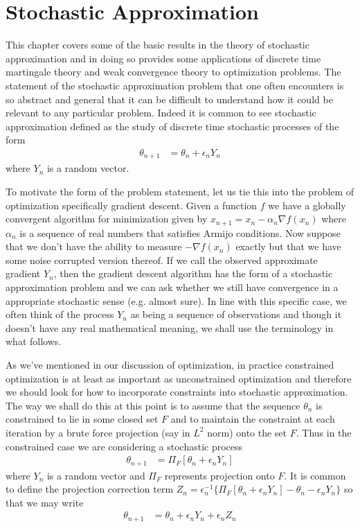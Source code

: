 \chapter{Stochastic Approximation}

This chapter covers some of the basic results in the theory of stochastic approximation and in doing so provides some applications of discrete time martingale theory and weak convergence theory to optimization problems.  The statement of the stochastic approximation problem that one often encounters is so abstract and general that it can be difficult to understand how it could be relevant to any particular problem.  Indeed it is common to see stochastic approximation defined as the study of discrete time stochastic processes of the form 
\begin{align*}
\theta_{n+1} &= \theta_n + \epsilon_n Y_n
\end{align*} 
where $Y_n$ is a random vector.

To motivate the form of the problem statement, let us tie this into the problem of optimization specifically gradient descent.  Given a function $f$ we have a globally convergent algorithm for minimization given by $x_{n+1} = x_n - \alpha_n \nabla f(x_n)$ where $\alpha_n$ is a sequence of real numbers that satisfies Armijo conditions.  Now suppose that we don't have the ability to measure $-\nabla f(x_n)$ exactly but that we have some noise corrupted  version thereof.  If we call the observed approximate gradient $Y_n$, then the gradient descent algorithm has the form of a stochastic approximation problem and we can ask whether we still have convergence in a appropriate stochastic sense (e.g. almost sure).  In line with this specific case, we often think of the process $Y_n$ as being a sequence of observations and though it doesn't have any real mathematical meaning, we shall use the terminology in what follows.

As we've mentioned in our discussion of optimization, in practice constrained optimization is at least as important as unconstrained optimization and therefore we should look for how to incorporate constraints into stochastic approximation.  The way we shall do this at this point is to assume that the sequence $\theta_n$ is constrained to lie in some closed set $F$ and to maintain the constraint at each iteration by a brute force projection (say in $L^2$ norm) onto the set $F$.   Thus in the constrained case we are considering a stochastic process 
\begin{align*}
\theta_{n+1} &= \Pi_F \left[ \theta_n + \epsilon_n Y_n\right ]
\end{align*} 
where $Y_n$ is a random vector and $\Pi_F$ represents projection onto $F$.  It is common to define the projection correction term $Z_n =  \epsilon_n^{-1} \lbrace \Pi_F \left[ \theta_n + \epsilon_n Y_n\right ] -   \theta_n - \epsilon_n Y_n \rbrace$ so that we may write 
\begin{align*}
\theta_{n+1} &= \theta_n + \epsilon_n Y_n + \epsilon_n Z_n
\end{align*} 

